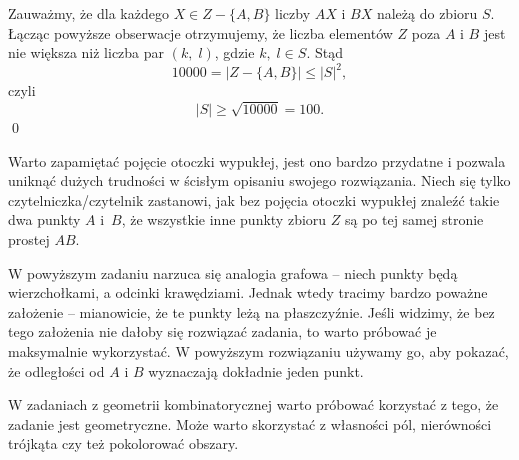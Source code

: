 \vspace{10px}
\noindent
Zauważmy, że dla każdego $X \in Z - \{A, B\}$ liczby $AX$ i $BX$ należą do zbioru $S$. Łącząc powyższe obserwacje otrzymujemy, że liczba elementów $Z$ poza $A$ i $B$ jest nie większa niż liczba par $(k, \; l)$, gdzie $k, \; l \in S$. Stąd
\[
	10000 = |Z - \{A, B\}| \leqslant |S|^2,
\]
czyli
\[
	|S| \geqslant \sqrt{10000} = 100. 
\]
\qed

\noindent
Warto zapamiętać pojęcie otoczki wypukłej, jest ono bardzo przydatne i pozwala uniknąć dużych trudności w ścisłym opisaniu swojego rozwiązania. Niech się tylko czytelniczka/czytelnik zastanowi, jak bez pojęcia otoczki wypukłej znaleźć takie dwa punkty $A$ i~$B$, że wszystkie inne punkty zbioru $Z$ są po tej samej stronie prostej $AB$.

\vspace{5px}
\noindent
W powyższym zadaniu narzuca się analogia grafowa -- niech punkty będą wierzchołkami, a odcinki krawędziami. Jednak wtedy tracimy bardzo poważne założenie -- mianowicie, że te punkty leżą na płaszczyźnie. Jeśli widzimy, że bez tego założenia nie dałoby się rozwiązać zadania, to warto próbować je maksymalnie wykorzystać. W powyższym rozwiązaniu używamy go, aby pokazać, że odległości od $A$ i $B$ wyznaczają dokładnie jeden punkt.

\vspace{5px}
\noindent
W zadaniach z geometrii kombinatorycznej warto próbować korzystać z tego, że zadanie jest geometryczne. Może warto skorzystać z własności pól, nierówności trójkąta czy też pokolorować obszary.

\vspace{5px}



